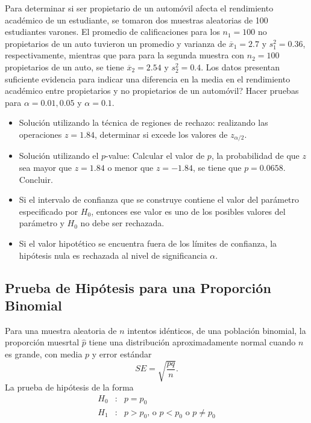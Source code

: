 \begin{Ejem}
Para determinar si ser propietario de un autom\'ovil afecta el rendimiento acad\'emico de un estudiante, se tomaron dos muestras aleatorias de 100 estudiantes varones. El promedio de calificaciones para los $n_{1}=100$ no propietarios de un auto tuvieron un promedio y varianza de $\overline{x}_{1}=2.7$ y $s_{1}^{2}=0.36$, respectivamente, mientras que para para la segunda muestra con $n_{2}=100$ propietarios de un auto, se tiene $\overline{x}_{2}=2.54$ y $s_{2}^{2}=0.4$. Los datos presentan suficiente evidencia para indicar una diferencia en la media en el rendimiento acad\'emico entre propietarios y no propietarios de un autom\'ovil? Hacer pruebas para $\alpha=0.01,0.05$ y $\alpha=0.1$.
\begin{itemize}
\item Soluci\'on utilizando la t\'ecnica de regiones de rechazo:\medskip
realizando las operaciones
$z=1.84$, determinar si excede los valores de $z_{\alpha/2}$.
\item Soluci\'on utilizando el $p$-value:\medskip
Calcular el valor de $p$, la probabilidad de que $z$ sea mayor que $z=1.84$ o menor que $z=-1.84$, se tiene que $p=0.0658$. Concluir.

\item Si el intervalo de confianza que se construye contiene el valor del par\'ametro especificado por $H_{0}$, entonces ese valor es uno de los posibles valores del par\'ametro y $H_{0}$ no debe ser rechazada.

\item Si el valor hipot\'etico se encuentra fuera de los l\'imites de confianza, la hip\'otesis nula es rechazada al nivel de significancia $\alpha$.
\end{itemize}
\end{Ejem}

\subsection*{Prueba de Hip\'otesis para una Proporci\'on Binomial}

Para una muestra aleatoria de $n$ intentos id\'enticos, de una poblaci\'on binomial, la proporci\'on muesrtal $\hat{p}$ tiene una distribuci\'on aproximadamente normal cuando $n$ es grande, con media $p$ y error est\'andar
$$SE=\sqrt{\frac{pq}{n}}.$$
La prueba de hip\'otesis de la forma
\begin{eqnarray*}
H_{0}&:&p=p_{0}\\
H_{1}&:&p>p_{0}\textrm{, o }p<p_{0}\textrm{ o }p\neq p_{0}
\end{eqnarray*}

